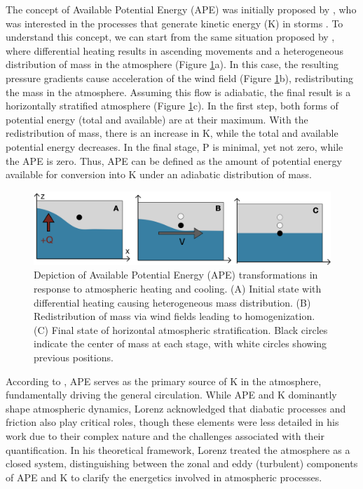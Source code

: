 The concept of Available Potential Energy (APE) was initially proposed by \citet{margules1903uber}, who was interested in the processes that generate kinetic energy (K) in storms \citep{marquet2017last}. To understand this concept, we can start from the same situation proposed by \citet{lorenz1955}, where differential heating results in ascending movements and a heterogeneous distribution of mass in the atmosphere (Figure \ref{APE}a). In this case, the resulting pressure gradients cause acceleration of the wind field (Figure \ref{APE}b), redistributing the mass in the atmosphere. Assuming this flow is adiabatic, the final result is a horizontally stratified atmosphere (Figure \ref{APE}c). In the first step, both forms of potential energy (total and available) are at their maximum. With the redistribution of mass, there is an increase in K, while the total and available potential energy decreases. In the final stage, P is minimal, yet not zero, while the APE is zero. Thus, APE can be defined as the amount of potential energy available for conversion into K under an adiabatic distribution of mass.

\begin{figure}[h]
\begin{center}
\setcaptionmargin{1cm}
\includegraphics[width=1.0 \columnwidth,angle=0]{fig/APE.png}
\caption[Available Potential Energy]{Depiction of Available Potential Energy (APE) transformations in response to atmospheric heating and cooling. (A) Initial state with differential heating causing heterogeneous mass distribution. (B) Redistribution of mass via wind fields leading to homogenization. (C) Final state of horizontal atmospheric stratification. Black circles indicate the center of mass at each stage, with white circles showing previous positions.}
\label{APE}
\end{center}
\end{figure}

According to \citet{lorenz1955}, APE serves as the primary source of K in the atmosphere, fundamentally driving the general circulation. While APE and K dominantly shape atmospheric dynamics, Lorenz acknowledged that diabatic processes and friction also play critical roles, though these elements were less detailed in his work due to their complex nature and the challenges associated with their quantification. In his theoretical framework, Lorenz treated the atmosphere as a closed system, distinguishing between the zonal and eddy (turbulent) components of APE and K to clarify the energetics involved in atmospheric processes.

